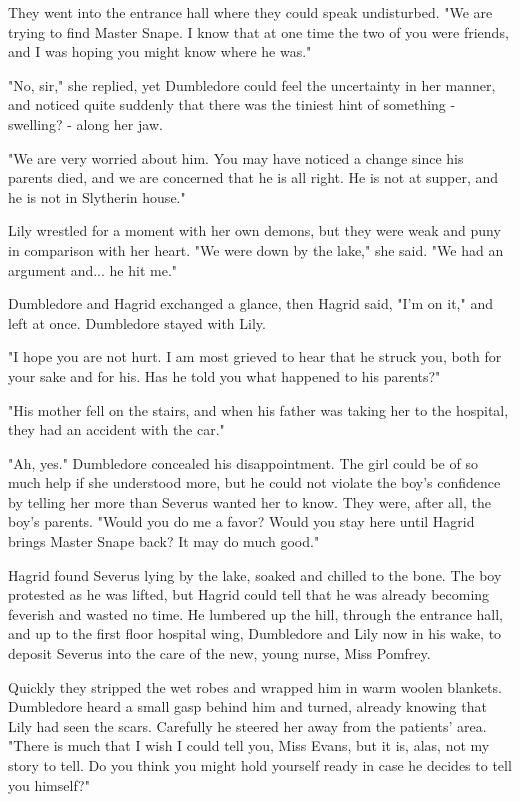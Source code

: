 \documentclass[a4paper,11pt]{article}
\begin{document}
They went into the entrance hall where they could speak undisturbed. "We are trying to find Master Snape. I know that at one time the two of you were friends, and I was hoping you might know where he was."

"No, sir," she replied, yet Dumbledore could feel the uncertainty in her manner, and noticed quite suddenly that there was the tiniest hint of something - swelling? - along her jaw.

"We are very worried about him. You may have noticed a change since his parents died, and we are concerned that he is all right. He is not at supper, and he is not in Slytherin house."

Lily wrestled for a moment with her own demons, but they were weak and puny in comparison with her heart. "We were down by the lake," she said. "We had an argument and... he hit me."

Dumbledore and Hagrid exchanged a glance, then Hagrid said, "I'm on it," and left at once. Dumbledore stayed with Lily.

"I hope you are not hurt. I am most grieved to hear that he struck you, both for your sake and for his. Has he told you what happened to his parents?"

"His mother fell on the stairs, and when his father was taking her to the hospital, they had an accident with the car."

"Ah, yes." Dumbledore concealed his disappointment. The girl could be of so much help if she understood more, but he could not violate the boy's confidence by telling her more than Severus wanted her to know. They were, after all, the boy's parents. "Would you do me a favor? Would you stay here until Hagrid brings Master Snape back? It may do much good."

Hagrid found Severus lying by the lake, soaked and chilled to the bone. The boy protested as he was lifted, but Hagrid could tell that he was already becoming feverish and wasted no time. He lumbered up the hill, through the entrance hall, and up to the first floor hospital wing, Dumbledore and Lily now in his wake, to deposit Severus into the care of the new, young nurse, Miss Pomfrey.

Quickly they stripped the wet robes and wrapped him in warm woolen blankets. Dumbledore heard a small gasp behind him and turned, already knowing that Lily had seen the scars. Carefully he steered her away from the patients' area. "There is much that I wish I could tell you, Miss Evans, but it is, alas, not my story to tell. Do you think you might hold yourself ready in case he decides to tell you himself?"
\end{document}
